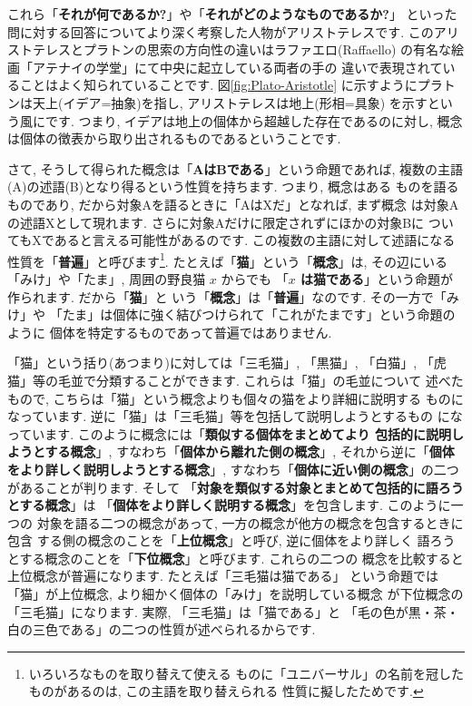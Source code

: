 \documentclass[b5j,8pt,twocolumn]{ltjsarticle}
\begin{document}
これら「\textbf{それが何であるか?}」や「\textbf{それがどのようなものであるか?}」
といった問に対する回答についてより深く考察した人物がアリストテレスです.
 このアリストテレスとプラトンの思索の方向性の違いはラファエロ(Raffaello)
の有名な絵画「アテナイの学堂」\cite{アテナイ}にて中央に起立している両者の手の
違いで表現されていることはよく知られていることです. 図\ref{fig:Plato-Aristotle}
に示すようにプラトンは天上(イデア=抽象)を指し, アリストテレスは地上(形相=具象)
を示すという風にです. つまり, イデアは地上の個体から超越した存在であるのに対し,
 概念は個体の徴表から取り出されるものであるということです.
\newline

さて, そうして得られた概念は「\textbf{AはBである}」という命題であれば,
 複数の主語(A)の述語(B)となり得るという性質を持ちます. つまり, 概念はある
ものを語るものであり, だから対象Aを語るときに「AはXだ」となれば, まず概念
は対象Aの述語Xとして現れます. さらに対象Aだけに限定されずにほかの対象Bに
ついてもXであると言える可能性があるのです. この複数の主語に対して述語になる
性質を「\textbf{普遍}」と呼びます\footnote{いろいろなものを取り替えて使える
ものに「ユニバーサル」の名前を冠したものがあるのは, この主語を取り替えられる
性質に擬したためです.}. たとえば「\textbf{猫}」という「\textbf{概念}」は,
 その辺にいる「みけ」や「たま」, 周囲の野良猫 $x$ からでも
 「\textbf{$x$ は猫である}」という命題が作られます. だから「\textbf{猫}」と
いう「\textbf{概念}」は「\textbf{普遍}」なのです. その一方で「みけ」や
「たま」は個体に強く結びつけられて「これがたまです」という命題のように
個体を特定するものであって普遍ではありません. 
\newline

「猫」という括り(あつまり)に対しては「三毛猫」, 「黒猫」, 「白猫」,
 「虎猫」等の毛並で分類することができます. これらは「猫」の毛並について
述べたもので, こちらは「猫」という概念よりも個々の猫をより詳細に説明する
ものになっています. 逆に「猫」は「三毛猫」等を包括して説明しようとするもの
になっています. このように概念には「\textbf{類似する個体をまとめてより
包括的に説明しようとする概念}」, すなわち「\textbf{個体から離れた側の概念}」,
 それから逆に「\textbf{個体をより詳しく説明しようとする概念}」, 
 すなわち「\textbf{個体に近い側の概念}」の二つがあることが判ります. そして
「\textbf{対象を類似する対象とまとめて包括的に語ろうとする概念}」は
「\textbf{個体をより詳しく説明する概念}」を包含します. このように一つの
対象を語る二つの概念があって, 一方の概念が他方の概念を包含するときに包含
する側の概念のことを「\textbf{上位概念}」と呼び, 逆に個体をより詳しく
語ろうとする概念のことを「\textbf{下位概念}」と呼びます. これらの二つの
概念を比較すると上位概念が普遍になります. たとえば「三毛猫は猫である」
という命題では「猫」が上位概念, より細かく個体の「みけ」を説明している概念
が下位概念の「三毛猫」になります. 実際, 「三毛猫」は「猫である」と
「毛の色が黒・茶・白の三色である」の二つの性質が述べられるからです.
\newline
\end{document}
